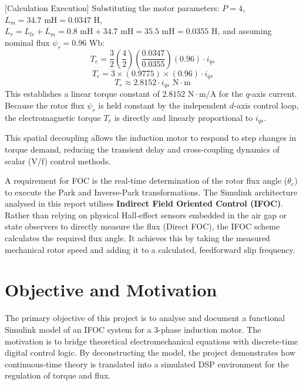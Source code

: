 \documentclass[12pt,a4paper]{report}
\begin{document}
[Calculation Execution] Substituting the motor parameters: $P = 4$, $L_m = 34.7 \text{ mH} = 0.0347 \text{ H}$, $L_r = L_{lr} + L_m = 0.8 \text{ mH} + 34.7 \text{ mH} = 35.5 \text{ mH} = 0.0355 \text{ H}$, and assuming nominal flux $\psi_r = 0.96 \text{ Wb}$:
\begin{equation}
T_e = \frac{3}{2} \left(\frac{4}{2}\right) \left(\frac{0.0347}{0.0355}\right) (0.96) \cdot i_{qs}
\end{equation}
\begin{equation}
T_e = 3 \times (0.9775) \times (0.96) \cdot i_{qs}
\end{equation}
\begin{equation}
T_e \approx 2.8152 \cdot i_{qs} \text{ N}\cdot\text{m}
\end{equation}
This establishes a linear torque constant of $2.8152 \text{ N}\cdot\text{m/A}$ for the $q$-axis current. Because the rotor flux $\psi_r$ is held constant by the independent $d$-axis control loop, the electromagnetic torque $T_e$ is directly and linearly proportional to $i_{qs}$.

This spatial decoupling allows the induction motor to respond to step changes in torque demand, reducing the transient delay and cross-coupling dynamics of scalar (V/f) control methods.

A requirement for FOC is the real-time determination of the rotor flux angle ($\theta_e$) to execute the Park and Inverse-Park transformations. The Simulink architecture analysed in this report utilises \textbf{Indirect Field Oriented Control (IFOC)}. Rather than relying on physical Hall-effect sensors embedded in the air gap or state observers to directly measure the flux (Direct FOC), the IFOC scheme calculates the required flux angle. It achieves this by taking the measured mechanical rotor speed and adding it to a calculated, feedforward slip frequency.

\section{Objective and Motivation}
The primary objective of this project is to analyse and document a functional Simulink model of an IFOC system for a 3-phase induction motor. The motivation is to bridge theoretical electromechanical equations with discrete-time digital control logic. By deconstructing the model, the project demonstrates how continuous-time theory is translated into a simulated DSP environment for the regulation of torque and flux.
\end{document}

